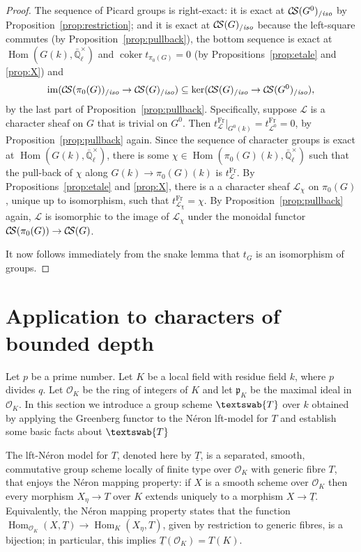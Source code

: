 \documentclass[11pt]{amsart}
\theoremstyle{plain}
\theoremstyle{definition}
\theoremstyle{remark}
\newcommand{\EE}{\mathbb{\bar Q}_\ell}
\newcommand{\OK}{\mathcal{O}_K}
\newcommand{\pK}{\mathfrak{p}_K}
\newcommand{\Fq}{k}
\newcommand{\Frob}{{\operatorname{Fr}}}
\DeclareMathOperator{\Hom}{Hom}
\DeclareMathOperator{\coker}{coker}
\newcommand{\GN}[1]{\textswab{#1}}
\newcommand{\TT}{\underline{T}}
\newcommand{\cs}[1]{{\mathcal{#1}}}
\newcommand{\CS}{{\mathcal{C\hskip-1.8pt S}}}
\newcommand{\CSiso}[1]{\CS(#1)_{/\textit{iso}}}
\newcommand{\image}{{\operatorname{im}}}
\begin{document}
\begin{proof}
  The sequence of Picard groups is right-exact: it is exact at
  $\CSiso{G^0}$ by Proposition~\ref{prop:restriction}; and
  it is exact at $\CSiso{G}$ because the left-square
  commutes (by Proposition~\ref{prop:pullback}), the bottom sequence
  is exact at $\Hom(G(\Fq),\EE^\times)$ and $\coker t_{\pi_0(G)} =0$
  (by Propositions~\ref{prop:etale} and \ref{prop:X}) and
  \[
  \image(\CSiso{\pi_0(G)} \to \CSiso{G}) \subseteq \ker(\CSiso{G} \to \CSiso{G^0}),
  \]
  by the last part of Proposition~\ref{prop:pullback}. Specifically,
  suppose $\cs{L}$ is a character sheaf on $G$ that is trivial on
  $G^0$. Then $t^\Frob_\cs{L}\vert_{G^0(\Fq)} = t^\Frob_{\cs{L}^0} =0$,
  by Proposition~\ref{prop:pullback} again. Since the sequence of
  character groups is exact at $\Hom(G(\Fq),\EE^\times)$, there is
  some $\chi \in \Hom(\pi_0(G)(\Fq),\EE^\times)$ such that the
  pull-back of $\chi$ along $G(\Fq)\to \pi_0(G)(\Fq)$ is
  $t^\Frob_\cs{L}$. By Propositions~\ref{prop:etale} and \ref{prop:X},
  there is a a character sheaf $\cs{L}_\chi$ on $\pi_0(G)$, unique up
  to isomorphism, such that $t^\Frob_{\cs{L}_\chi} = \chi$. By
  Proposition~\ref{prop:pullback} again, $\cs{L}$ is isomorphic to the
  image of $\cs{L}_\chi$ under the monoidal functor $\CS(\pi_0(G)) \to \CS(G)$.

  It now follows immediately from the snake lemma that $t_{G}$ is an
  isomorphism of groups.
\end{proof}

\section{Application to characters of bounded depth}

%
Let $p$ be a prime number. Let $K$ be a local field with residue field
$\Fq$, where $p$ divides $q$. Let $\OK$ be the ring of integers of $K$
and let $\pK$ be the maximal ideal in $\OK$.
%
In this section we introduce a group scheme $\GN{T}$ over $\Fq$
obtained by applying the Greenberg functor to the N\'eron lft-model
for $T$ and establish some basic facts about $\GN{T}$


The lft-N\'eron model for $T$, denoted here by $\TT$, is a separated,
smooth, commutative group scheme locally of finite type over $\OK$
with generic fibre $T$, that enjoys the N\'eron mapping property: if
$X$ is a smooth scheme over $\OK$ then every morphism $X_\eta \to T$
over $K$ extends uniquely to a morphism $X \to \TT$. Equivalently, the
N\'eron mapping property states that the function
$\Hom_{\OK} (X,\TT) \to \Hom_K(X_\eta,T)$, given by restriction to
generic fibres, is a bijection; in particular, this implies $\TT(\OK) = T(K)$.
\end{document}
